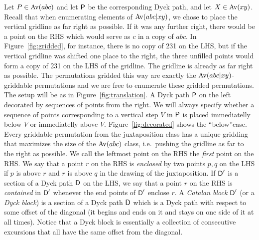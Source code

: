\documentclass[12pt, a4paper, twoside]{report}
\begin{document}
Let $P \in \mathrm{Av}(abc)$ and let $\textsf{P}$ be the corresponding Dyck path, and let $X \in \mathrm{Av}(xy)$. Recall that when enumerating elements of $\mathrm{Av}(abc|xy)$, we chose to place the vertical gridline as far right as possible.  If it was any further right, there would be a point on the RHS which would serve as $c$ in a copy of $abc$. In Figure~\ref{fig:gridded}, for instance, there is no copy of 231 on the LHS, but if the vertical gridline was shifted one place to the right, the three unfilled points would form a copy of 231 on the LHS of the gridline. The gridline is already as far right as possible. The permutations gridded this way are exactly the $\mathrm{Av}(abc|xy)$-griddable permutations and we are free to enumerate these gridded permutations. The setup will be as in Figure~\ref{fig:translation}. A Dyck path $\textsf{P}$ on the left decorated by sequences of points from the right. We will always specify whether a sequence of points corresponding to a vertical step $V$ in $\textsf{P}$ is placed immediatelly below $V$ or immediatelly above $V$. Figure~\ref{fig:decorated} shows the ``below''case. Every griddable permutation from the juxtaposition class has a unique gridding that maximizes the size of the $\mathrm{Av}(abc)$ class, i.e.~pushing the gridline as far to the right as possible. We call the leftmost point on the RHS the \emph{first} point on the RHS. We say that a point $r$ on the RHS is \emph{enclosed} by two points $p,q$ on the LHS if $p$ is above $r$ and $r$ is above $q$ in the drawing of the juxtaposition. If $\textsf{D}'$ is a section of a Dyck path $\textsf{D}$ on the LHS, we say that a point $r$ on the RHS is \emph{contained} in $\textsf{D}'$ whenever the end points of $\textsf{D}'$ enclose $r$. A \emph{Catalan block} $\textsf{D}'$ (or a \emph{Dyck block}) is a section of a Dyck path $\textsf{D}$ which is a Dyck path with respect to some offset of the diagonal (it begins and ends on it and stays on one side of it at all times). Notice that a Dyck block is essentially a collection of consecutive excursions that all have the same offset from the diagonal.
\end{document}
